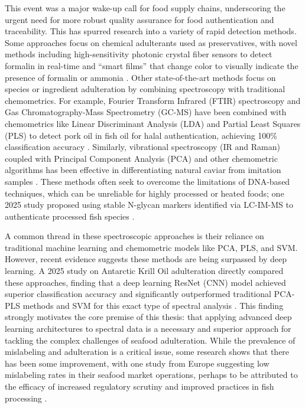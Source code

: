 This event was a major wake-up call for food supply chains, underscoring the urgent need for more robust quality assurance for food authentication and traceability. This has spurred research into a variety of rapid detection methods. Some approaches focus on chemical adulterants used as preservatives, with novel methods including high-sensitivity photonic crystal fiber sensors to detect formalin in real-time \citep{Veluchamy2025} and ``smart films'' that change color to visually indicate the presence of formalin or ammonia \citep{Moeinpour2025}.
Other state-of-the-art methods focus on species or ingredient adulteration by combining spectroscopy with traditional chemometrics. For example, Fourier Transform Infrared (FTIR) spectroscopy and Gas Chromatography-Mass Spectrometry (GC-MS) have been combined with chemometrics like Linear Discriminant Analysis (LDA) and Partial Least Squares (PLS) to detect pork oil in fish oil for halal authentication, achieving 100\% classification accuracy \citep{Lestari2025}. Similarly, vibrational spectroscopy (IR and Raman) coupled with Principal Component Analysis (PCA) and other chemometric algorithms has been effective in differentiating natural caviar from imitation samples \citep{Amelin2025}. These methods often seek to overcome the limitations of DNA-based techniques, which can be unreliable for highly processed or heated foods; one 2025 study proposed using stable N-glycan markers identified via LC-IM-MS to authenticate processed fish species \citep{Walsh2025}.

A common thread in these spectroscopic approaches is their reliance on traditional machine learning and chemometric models like PCA, PLS, and SVM. However, recent evidence suggests these methods are being surpassed by deep learning. A 2025 study on Antarctic Krill Oil adulteration directly compared these approaches, finding that a deep learning ResNet (CNN) model achieved superior classification accuracy and significantly outperformed traditional PCA-PLS methods and SVM for this exact type of spectral analysis \citep{Ke2025}. This finding strongly motivates the core premise of this thesis: that applying advanced deep learning architectures to spectral data is a necessary and superior approach for tackling the complex challenges of seafood adulteration.
While the prevalence of mislabeling and adulteration is a critical issue, some research shows that there has been some improvement, with one study from Europe suggesting low mislabeling rates in their seafood market operations, perhaps to be attributed to the efficacy of increased regulatory scrutiny and improved practices in fish processing \citep{Mariani2015}.

